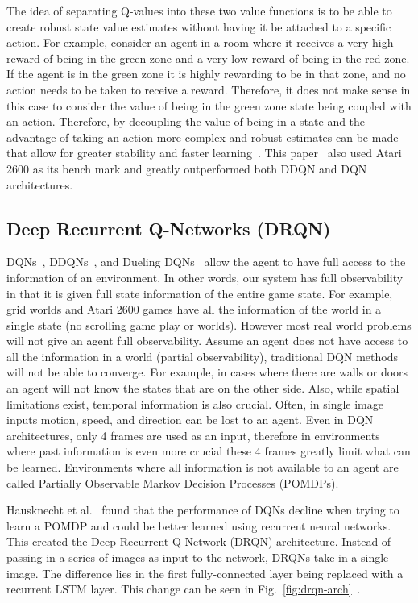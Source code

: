 \documentclass[12pt,american]{report}
\begin{document}
The idea of separating Q-values into these two value functions is to be able to create robust state value estimates without having it be attached to a specific action.  For example, consider an agent in a room where it receives a very high reward of being in the green zone and a very low reward of being in the red zone. If the agent is in the green zone it is highly rewarding to be in that zone, and no action needs to be taken to receive a reward. Therefore, it does not make sense in this case to consider the value of being in the green zone state being coupled with an action. Therefore, by decoupling the value of being in a state and the advantage of taking an action more complex and robust estimates can be made that allow for greater stability and faster learning~\cite{wang2015dueling}. This paper~\cite{wang2015dueling} also used Atari 2600 as its bench mark and greatly outperformed both DDQN and DQN architectures. 

\subsection{Deep Recurrent Q-Networks (DRQN)}
DQNs~\cite{atari}, DDQNs~\cite{van2016deep}, and Dueling DQNs~\cite{wang2015dueling} allow the agent to have full access to the information of an environment. In other words, our system has full observability in that it is given full state information of the entire game state.  For example, grid worlds and Atari 2600 games have all the information of the world in a single state (no scrolling game play or worlds). However most real world problems will not give an agent full observability. Assume an agent does not have access to all the information in a world (partial observability), traditional DQN methods will not be able to converge. For example, in cases where there are walls or doors an agent will not know the states that are on the other side. Also, while spatial limitations exist, temporal information is also crucial.  Often, in single image inputs motion, speed, and direction can be lost to an agent. Even in DQN architectures, only 4 frames are used as an input, therefore in environments where past information is even more crucial these 4 frames greatly limit what can be learned. Environments where all information is not available to an agent are called Partially Observable Markov Decision Processes (POMDPs).  

Hausknecht et al.~\cite{HausknechtDRQN} found that the performance of DQNs decline when trying to learn a POMDP and could be better learned using recurrent neural networks. This created the Deep Recurrent Q-Network (DRQN) architecture. Instead of passing in a series of images as input to the network, DRQNs take in a single image. The difference lies in the first fully-connected layer being replaced with a recurrent LSTM layer. This change can be seen in Fig.~\ref{fig:drqn-arch}~\cite{HausknechtDRQN}.
\end{document}
